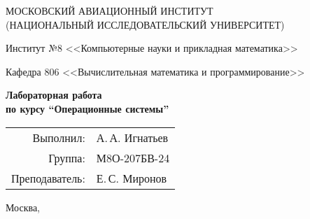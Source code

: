 \begin{titlepage}
\begin{center}
\large
МОСКОВСКИЙ АВИАЦИОННЫЙ ИНСТИТУТ\\ (НАЦИОНАЛЬНЫЙ ИССЛЕДОВАТЕЛЬСКИЙ УНИВЕРСИТЕТ)

\vspace{20pt}

Институт №8 <<Компьютерные науки и прикладная математика>>

Кафедра 806 <<Вычислительная математика и программирование>>
\end{center}

\vspace{60pt}

\begin{center}
\bfseries
\large
Лабораторная работа  \\по курсу \enquote{Операционные системы}

\vspace{54pt}

\end{center}

\vfill

\begin{flushright}
\large
\begin{tabular}{rl}
Выполнил: & А.\,А. Игнатьев \\
Группа: & М8О-207БВ-24 \\
Преподаватель: & Е.\,С. Миронов \\
\end{tabular}
\end{flushright}

\vspace{92pt}

\begin{center}
\large
Москва, \the\year
\end{center}
\end{titlepage}

\pagebreak
